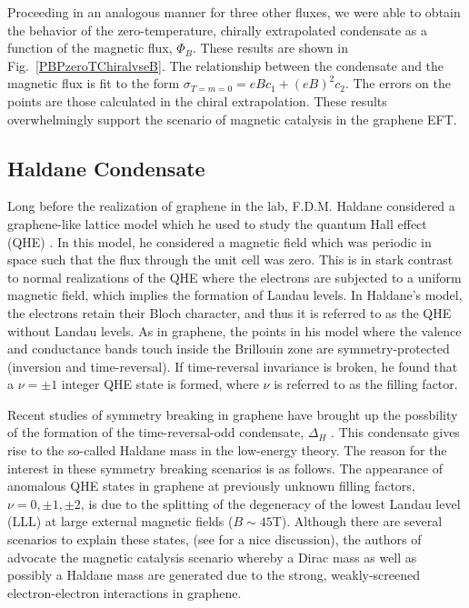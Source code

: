 \documentclass[aps,prd,twocolumn,showpacs,superscriptaddress,groupedaddress]{revtex4}  %
\begin{document}
Proceeding in an analogous manner for three other fluxes, we were able to obtain the behavior of the zero-temperature, chirally extrapolated condensate as a function of the magnetic flux, $\Phi_B$. These results are shown in Fig.~\ref{PBPzeroTChiralvseB}.
The relationship between the condensate and the magnetic flux is fit to the form $\sigma_{T=m=0} = eBc_1 + (eB)^2c_2$. The errors on the points are those calculated in the chiral extrapolation. These results overwhelmingly support the scenario of magnetic catalysis in the graphene EFT.

\subsection{\label{sec:HaldaneCond}Haldane Condensate}
Long before the realization of graphene in the lab, F.D.M. Haldane considered a graphene-like lattice model which he used to study the quantum Hall effect (QHE) \cite{Haldane}.
In this model, he considered a magnetic field which was periodic in space such that the flux through the unit cell was zero. This is in stark contrast to normal realizations of the QHE 
where the electrons are subjected to a uniform magnetic field, which implies the formation of Landau levels. In Haldane's model, the electrons retain their Bloch character, and thus it is referred to 
as the QHE without Landau levels. As in graphene, the points in his model where the valence and conductance bands touch inside the Brillouin zone are symmetry-protected (inversion and time-reversal).
If time-reversal invariance is broken, he found that a $\nu = \pm 1$ integer QHE state is formed, where $\nu$ is referred to as the filling factor. 

Recent studies of symmetry breaking in graphene have brought up the possbility of the formation of the time-reversal-odd condensate, $\Delta_H$ \cite{GonzalezHaldaneMass, MiranskyGraphene2,MiranskyGraphene3}. This condensate gives rise to the so-called Haldane mass in the low-energy theory.
The reason for the interest in these symmetry breaking scenarios is as follows.
The appearance of anomalous QHE states in graphene at previously unknown filling factors, $\nu = 0, \pm 1, \pm 2$, is due to the splitting of the degeneracy of the lowest Landau level (LLL) at large external magnetic fields ($B \sim 45 \text{T}$).
Although there are several scenarios to explain these states, (see \cite{Yang} for a nice discussion), the authors of \cite{MiranskyGraphene2, MiranskyGraphene3} advocate the magnetic catalysis scenario whereby a Dirac mass as well as possibly a Haldane mass are generated due to the strong, weakly-screened
electron-electron interactions in graphene.
\end{document}
